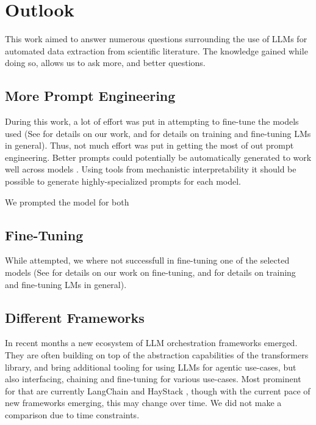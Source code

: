 \chapter{Outlook}\label{chap:outlook}
This work aimed to answer numerous questions surrounding the use of \glspl{LLM} for automated data extraction from scientific literature.
The knowledge gained while doing so, allows us to ask more, and better questions.

\section{More Prompt Engineering}\label{sec:out-prompt}
During this work, a lot of effort was put in attempting to fine-tune the models used (See  for details on our work, and  for details on training and fine-tuning \glspl{LM} in general).
Thus, not much effort was put in getting the most of out prompt engineering.
Better prompts could potentially be automatically generated to work well across models \cite{zhou_large_2022}.
Using tools from mechanistic interpretability \cite{conmy_automated_2023} it should be possible to generate highly-specialized prompts \cite{rumbelow_solidgoldmagikarp_2023} for each model.


We prompted the model for both 

\section{Fine-Tuning}\label{sec:out-sft}
While attempted, we where not successfull in fine-tuning one of the selected models (See  for details on our work on fine-tuning, and  for details on training and fine-tuning \glspl{LM} in general).

\section{Different Frameworks}\label{sub:frameworks}
In recent months a new ecosystem of \gls{LLM} orchestration frameworks emerged.
They are often building on top of the abstraction capabilities of the \acrshort{transformers} library, and bring additional tooling for using \glspl{LLM} for agentic use-cases, but also interfacing, chaining and fine-tuning for various use-cases.
Most prominent for that are currently LangChain \cite{langchain_2023} and HayStack \cite{haystack_2023}, though with the current pace of new frameworks emerging, this may change over time.
We did not make a comparison due to time constraints.


